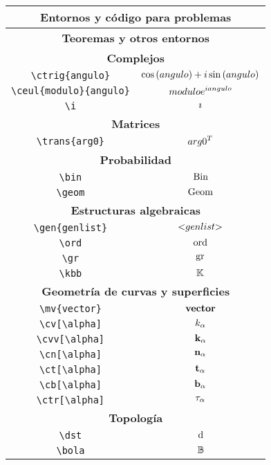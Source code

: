 \begin{longtable}{|c|c|}
\multicolumn{2}{|c|}{\textbf{Entornos y código para problemas}} \\ \hline 
\multicolumn{2}{|c|}{\textbf{Teoremas y otros entornos}} \\ \hline 
\multicolumn{2}{|c|}{\textbf{Complejos}} \\ \hline 
\verb|\ctrig{angulo}| & $\displaystyle\ctrig{angulo}$ \\ \hline 
\verb|\ceul{modulo}{angulo}| & $\displaystyle\ceul{modulo}{angulo}$ \\ \hline 
\verb|\i| & $\displaystyle\i$ \\ \hline 
\multicolumn{2}{|c|}{\textbf{Matrices}} \\ \hline 
\verb|\trans{arg0}| & $\displaystyle\trans{arg0}$ \\ \hline 
\multicolumn{2}{|c|}{\textbf{Probabilidad}} \\ \hline 
\verb|\bin| & $\displaystyle\bin$ \\ \hline 
\verb|\geom| & $\displaystyle\geom$ \\ \hline 
\multicolumn{2}{|c|}{\textbf{Estructuras algebraicas}} \\ \hline 
\verb|\gen{genlist}| & $\displaystyle\gen{genlist}$ \\ \hline 
\verb|\ord| & $\displaystyle\ord$ \\ \hline 
\verb|\gr| & $\displaystyle\gr$ \\ \hline 
\verb|\kbb| & $\displaystyle\kbb$ \\ \hline 
\multicolumn{2}{|c|}{\textbf{Geometría de curvas y superficies}} \\ \hline 
\verb|\mv{vector}| & $\displaystyle\mv{vector}$ \\ \hline 
\verb|\cv[\alpha]| & $\displaystyle\cv[\alpha]$ \\ \hline 
\verb|\cvv[\alpha]| & $\displaystyle\cvv[\alpha]$ \\ \hline 
\verb|\cn[\alpha]| & $\displaystyle\cn[\alpha]$ \\ \hline 
\verb|\ct[\alpha]| & $\displaystyle\ct[\alpha]$ \\ \hline 
\verb|\cb[\alpha]| & $\displaystyle\cb[\alpha]$ \\ \hline 
\verb|\ctr[\alpha]| & $\displaystyle\ctr[\alpha]$ \\ \hline 
\multicolumn{2}{|c|}{\textbf{Topología}} \\ \hline 
\verb|\dst| & $\displaystyle\dst$ \\ \hline 
\verb|\bola| & $\displaystyle\bola$ \\ \hline 

\end{longtable}
